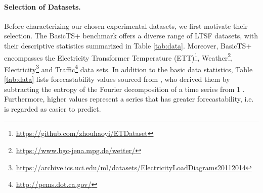 \documentclass[a4paper,oneside,bibliography=totoc]{scrbook}
\begin{document}
\paragraph{Selection of Datasets.}
Before characterizing our chosen experimental datasets, we first motivate their selection. The BasicTS+ benchmark offers a diverse range of LTSF datasets, with their descriptive statistics summarized in Table \ref{tab:data}.
Moreover, BasicTS+ encompasses the Electricity Transformer Temperature (ETT)\footnote{\href{https://github.com/zhouhaoyi/ETDataset}{\url{https://github.com/zhouhaoyi/ETDataset}}}, Weather\footnote{\href{https://www.bgc-jena.mpg.de/wetter/}{\url{https://www.bgc-jena.mpg.de/wetter/}}}, Electricity\footnote{\href{https://archive.ics.uci.edu/ml/datasets/ElectricityLoadDiagrams20112014}{\url{https://archive.ics.uci.edu/ml/datasets/ElectricityLoadDiagrams20112014}}} and Traffic\footnote{\href{http://pems.dot.ca.gov/}{\url{http://pems.dot.ca.gov/}}} data sets.
In addition to the basic data statistics, Table \ref{tab:data} lists forecastability values sourced from \citet{shang_ada-mshyper_2024}, who derived them by subtracting the entropy of the Fourier decomposition of a time series from 1 \cite{wang_timemixer_2023, goerg_forecastable_2013}.
Furthermore, higher values represent a series that has greater forecastability, i.e. is regarded as easier to predict.
\end{document}
